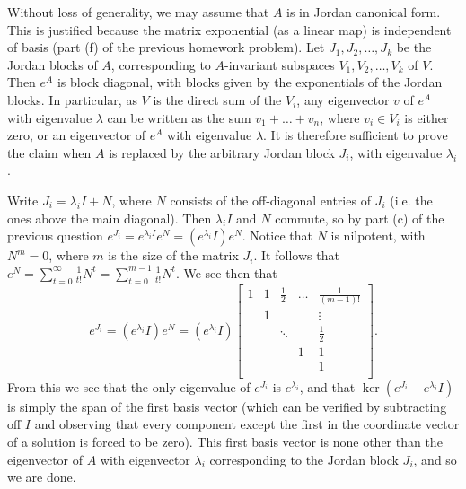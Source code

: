 \documentclass{scrartcl}
\begin{document}
\begin{solution}
    \begin{tproof}
    Without loss of generality, we may assume that $A$ is in Jordan canonical form. This is justified because the matrix exponential (as a linear map) is independent of basis (part (f) of the previous homework problem). Let $J_1,J_2,\dots, J_k$ be the Jordan blocks of $A$, corresponding to $A$-invariant subspaces $V_1,V_2,\dots, V_k$ of $V$. Then $e^A$ is block diagonal, with blocks given by the exponentials of the Jordan blocks. In particular, as $V$ is the direct sum of the $V_i$, any eigenvector $v$ of $e^A$ with eigenvalue $\lambda$ can be written as the sum $v_1+\dots + v_n$, where $v_i\in V_i$ is either zero, or an eigenvector of $e^A$ with eigenvalue $\lambda$. It is therefore sufficient to prove the claim when $A$ is replaced by the arbitrary Jordan block $J_i$, with eigenvalue $\lambda_i$.
    
    Write $J_i=\lambda_iI+N$, where $N$ consists of the off-diagonal entries of $J_i$ (i.e. the ones above the main diagonal). Then $\lambda_i I$ and $N$ commute, so by part (c) of the previous question $e^{J_i}=e^{\lambda_iI}e^N=(e^{\lambda_i}I)e^N$. Notice that $N$ is nilpotent, with $N^m=0$, where $m$ is the size of the matrix $J_i$. It follows that $e^N=\sum_{t=0}^\infty \tfrac{1}{t!}N^t=\sum_{t=0}^{m-1} \tfrac{1}{t!}N^t$. We see then that
    \[e^{J_i}=(e^{\lambda_i}I)e^N=(e^{\lambda_i}I)
    \begin{bmatrix}
    1 & 1 & \tfrac{1}{2} & \hdots & \tfrac{1}{(m-1)!} \\
    & 1 & & & \vdots \\
    & & \ddots & & \tfrac{1}{2} \\
    & & & 1 & 1 \\
    & & & & 1\\
    \end{bmatrix}.\]
    From this we see that the only eigenvalue of $e^{J_i}$ is $e^{\lambda_i}$, and that $\ker(e^{J_i}-e^{\lambda_i}I)$ is simply the span of the first basis vector (which can be verified by subtracting off $I$ and observing that every component except the first in the coordinate vector of a solution is forced to be zero). This first basis vector is none other than the eigenvector of $A$ with eigenvector $\lambda_i$ corresponding to the Jordan block $J_i$, and so we are done.
    \end{tproof}
    

\end{solution}
\end{document}
